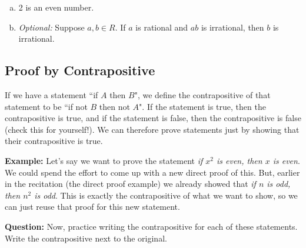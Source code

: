 \documentclass[12pt,letterpaper]{article}
\newif\ifsol
\begin{document}
      \begin{enumerate}[a.]

        \item 2 is an even number.

        \begin{mdframed}
		\ifsol
			Assume for sake of contradiction that 2 was odd. Then $2 = 2k+1$ for some integer $k$. Then $k = \frac{1}{2}$ which is a contradiction since $k$ is an integer.
		\else
        \vspace{4cm}
		\fi
        \end{mdframed}
        
        \item \textit{Optional:} Suppose $a,b \in R$. If $a$ is rational and $ab$ is irrational, then $b$ is irrational.
        
        \begin{mdframed}
		\ifsol
			Since $a$ is rational, $a = \frac{x}{y}$ for some $x, y \in \mathbb{Z}, y \neq 0$. Assume for sake of contradiction that $b$ is rational. Then $b = \frac{z}{w}$ for some $z, w \in \mathbb{Z}, w \neq 0$. This means $ab = \frac{xz}{yw}$ and $xz, yw \in \mathbb{Z}, yw \neq 0$, so $ab$ is rational, which is a contradiction.
		\else
        \vspace{4cm}
		\fi
        \end{mdframed}
      \end{enumerate}
		
	\subsection*{Proof by Contrapositive}
	If we have a statement ``if $A$ then $B$", we define the contrapositive of that statement to be ``if not $B$ then not $A$". If the statement is true, then the contrapositive is true, and if the statement is false, then the contrapositive is false (check this for yourself!). We can therefore prove statements just by showing that their contrapositive is true.
	
	\textbf{Example:} Let's say we want to prove the statement \textit{if $x^2$ is even, then $x$ is even}. We could spend the effort to come up with a new direct proof of this. But, earlier in the recitation (the direct proof example) we already showed that \textit{if $n$ is odd, then $n^2$ is odd}. This is exactly the contrapositive of what we want to show, so we can just reuse that proof for this new statement.
	
     \textbf{Question:} Now, practice writing the contrapositive for each of these statements. Write the contrapositive next to the original.  
\end{document}
